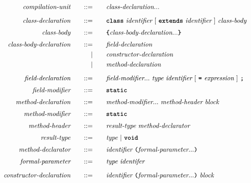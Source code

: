 \begin{alignat*}{9}
&& \textit{compilation-unit}                     && \quad ::= & \quad && \textit{class-declaration} ... && \\[2mm]
&& \textit{class-declaration}                    && \quad ::= & \quad && \textbf{\texttt{class}} \ \textit{identifier} \ [ \ \textbf{\texttt{extends}} \ \textit{identifier} \ ] \ \textit{class-body} && \\[1mm]
&& \textit{class-body}                           && \quad ::= & \quad && \textbf{\texttt{\{}} \textit{class-body-declaration} ... \textbf{\texttt{\}}} && \\[1mm]
&& \textit{class-body-declaration}               && \quad ::= & \quad && \textit{field-declaration} && \\
&&                                               &&         | & \quad && \textit{constructor-declaration} && \\
&&                                               &&         | & \quad && \textit{method-declaration} && \\[2mm]
&& \textit{field-declaration}                    && \quad ::= & \quad && \textit{field-modifier} ... \ \textit{type} \ \textit{identifier} \ [ \ \textbf{\texttt{=}} \ \textit{expression} \ ] \ \textbf{\texttt{;}} && \\[1mm]
&& \textit{field-modifier}                       && \quad ::= & \quad && \textbf{\texttt{static}} && \\[1mm]
&& \textit{method-declaration}                   && \quad ::= & \quad && \textit{method-modifier} ... \ \textit{method-header} \ \textit{block} && \\[1mm]
&& \textit{method-modifier}                      && \quad ::= & \quad && \textbf{\texttt{static}} && \\[1mm]
&& \textit{method-header}                        && \quad ::= & \quad && \textit{result-type} \ \textit{method-declarator} && \\[1mm]
&& \textit{result-type}                          && \quad ::= & \quad && \textit{type} \ | \ \textbf{\texttt{void}} && \\[1mm]
&& \textit{method-declarator}                    && \quad ::= & \quad && \textit{identifier} \ \textbf{\texttt{(}} \textit{formal-parameter} ... \textbf{\texttt{)}} && \\[1mm]
&& \textit{formal-parameter}                     && \quad ::= & \quad && \textit{type} \ \textit{identifer} && \\[2mm]
&& \textit{constructor-declaration}              && \quad ::= & \quad && \textit{identifier} \ \textbf{\texttt{(}} \textit{formal-parameter} ... \textbf{\texttt{)}} \ \textit{block} && \\[2mm]

\end{alignat*}
